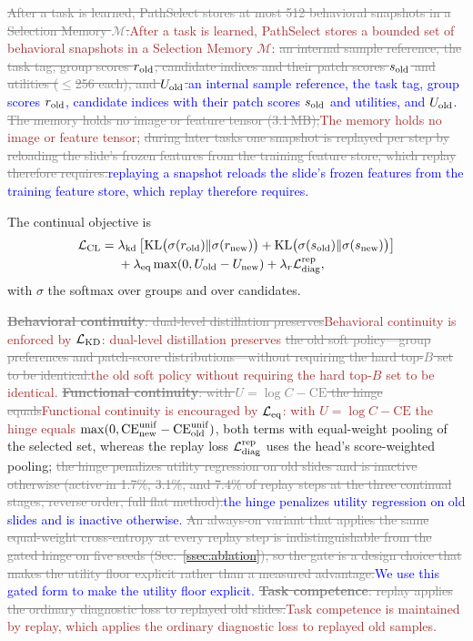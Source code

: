 \documentclass{article}
\newif\ifmarkup \markuptrue
\newcommand{\repc}[3]{\ifmarkup\textcolor{gray}{\sout{#2}}\textcolor{#1}{#3}\else#3\fi}
\newcommand{\repB}[2]{\repc{brown}{#1}{#2}}   %
\newcommand{\repL}[2]{\repc{blue}{#1}{#2}}    %
\def\L{{\cal L}}
\newcommand{\Mem}{\mathcal{M}}
\begin{document}
\repB{After a task is learned, PathSelect stores at most 512 behavioral snapshots in a Selection Memory $\Mem$:}{After a task is learned, PathSelect stores a bounded set of behavioral snapshots in a Selection Memory $\Mem$:} \repL{an internal sample reference, the task tag, group scores $r_{\rm old}$, candidate indices and their patch scores $s_{\rm old}$ and utilities ($\le$256 each), and $U_{\rm old}$.}{an internal sample reference, the task tag, group scores $r_{\rm old}$, candidate indices with their patch scores $s_{\rm old}$ and utilities, and $U_{\rm old}$.} \repB{The memory holds no image or feature tensor (3.1\,MB);}{The memory holds no image or feature tensor;} \repL{during later tasks one snapshot is replayed per step by reloading the slide's frozen features from the training feature store, which replay therefore requires.}{replaying a snapshot reloads the slide's frozen features from the training feature store, which replay therefore requires.}

The continual objective is
\begin{align}
\L_{\mathrm{CL}}
={}&
\lambda_{\mathrm{kd}}
\left[
\mathrm{KL}\bigl(\sigma(r_{\mathrm{old}})\Vert \sigma(r_{\mathrm{new}})\bigr)
+
\mathrm{KL}\bigl(\sigma(s_{\mathrm{old}})\Vert \sigma(s_{\mathrm{new}})\bigr)
\right]
\nonumber\\
&+
\lambda_{\mathrm{eq}}
\max(0,U_{\mathrm{old}}-U_{\mathrm{new}})
+
\lambda_r \L_{\mathrm{diag}}^{\mathrm{rep}},
\label{eq:lcl}
\end{align}
with $\sigma$ the softmax over groups and over candidates.

\repB{\textbf{Behavioral continuity}: dual-level distillation preserves}{Behavioral continuity is enforced by $\L_{\rm KD}$: dual-level distillation preserves} \repB{the old soft policy---group preferences and patch-score distributions---without requiring the hard top-$B$ set to be identical.}{the old soft policy without requiring the hard top-$B$ set to be identical.} \repB{\textbf{Functional continuity}: with $U=\log C-\mathrm{CE}$ the hinge equals}{Functional continuity is encouraged by $\L_{\rm eq}$: with $U=\log C-\mathrm{CE}$ the hinge equals} $\max(0,\mathrm{CE}^{\rm unif}_{\rm new}-\mathrm{CE}^{\rm unif}_{\rm old})$, both terms with equal-weight pooling of the selected set, whereas the replay loss $\L_{\mathrm{diag}}^{\mathrm{rep}}$ uses the head's score-weighted pooling; \repL{the hinge penalizes utility regression on old slides and is inactive otherwise (active in 1.7\%, 3.1\%, and 7.4\% of replay steps at the three continual stages, reverse order, full flat method).}{the hinge penalizes utility regression on old slides and is inactive otherwise.} \repL{An always-on variant that applies the same equal-weight cross-entropy at every replay step is indistinguishable from the gated hinge on five seeds (Sec.~\ref{ssec:ablation}), so the gate is a design choice that makes the utility floor explicit rather than a measured advantage.}{We use this gated form to make the utility floor explicit.} \repB{\textbf{Task competence}: replay applies the ordinary diagnostic loss to replayed old slides.}{Task competence is maintained by replay, which applies the ordinary diagnostic loss to replayed old samples.}
\end{document}
